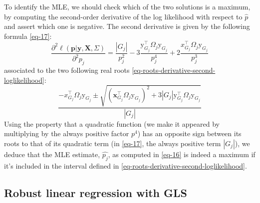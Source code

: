 \documentclass[pdflatex, sn-nature]{sn-jnl}
\theoremstyle{thmstyleone}%
\theoremstyle{thmstyletwo}%
\theoremstyle{thmstylethree}%
\begin{document}
\begin{appendices}
        To identify the MLE, we should check which of the two solutions is a maximum,
        by computing the second-order derivative of the log likelihood with
        respect to $\hat{p}$ and assert which one is negative. The second derivative
        is given by the following formula \ref{eq-17}:
        \begin{equation}
            \label{eq-17}\frac{\partial^{2}\ell(\boldsymbol{p}|\boldsymbol{y}, \boldsymbol{X},
            \Sigma)}{\partial^{2} p_{j}}= \frac{|G_{j}|}{p_{j}^{2}}-3 \frac{\mathrm{y}_{
            G_j}^{\top} \Omega_{j}\mathrm{y}_{ G_j}}{p_{j}^{4}}+ 2 \frac{x_{G_j}^{\top}
            \Omega_{j} \mathrm{y}_{ G_j}}{p_{j}^{3}}
        \end{equation}
        associated to the two following real roots
        \ref{eq-roots-derivative-second-loglikelihood}:
        \begin{equation}
            \label{eq-roots-derivative-second-loglikelihood}\frac{-x_{G_j}^{\top}
            \Omega_{j} \mathrm{y}_{ G_j}\pm
            \sqrt{\left( \boldsymbol{x}_{G_j}^\top \Omega_j \mathrm{y}_{ G_j}\right)^2
            + 3 |G_j| \mathrm{y}_{ G_j}^\top \Omega_{j} \mathrm{y}_{ G_j}}}{|G_{j}|}
        \end{equation}
        Using the property that a quadratic function (we make it appeared by
        multiplying by the always positive factor $p^{4}$) has an opposite sign between
        its roots to that of its quadratic term (in \ref{eq-17}, the always positive
        term $|G_{j}|$), we deduce that the MLE estimate, $\hat{p_j}$, as computed
        in \ref{eq-16} is indeed a maximum if it's included in the interval defined
        in \ref{eq-roots-derivative-second-loglikelihood}.

        \subsection{Robust linear regression with GLS}


\end{appendices}
\end{document}
